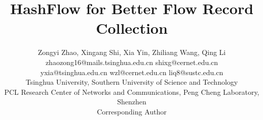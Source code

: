 \documentclass[10pt, conference, letterpaper]{IEEEtran}
\begin{document}
\title{HashFlow  for Better Flow Record Collection}
\author{Zongyi Zhao, Xingang Shi, Xia Yin, Zhiliang Wang, Qing Li\\ zhaozong16@mails.tsinghua.edu.cn shixg@cernet.edu.cn \\
	yxia@tsinghua.edu.cn wzl@cernet.edu.cn liq8@sustc.edu.cn\\ 
	Tsinghua University, Southern University of Science and Technology\\ PCL Research Center of Networks and Communications, Peng Cheng Laboratory, Shenzhen\\ Corresponding Author}
\maketitle







%



%

\end{document}
